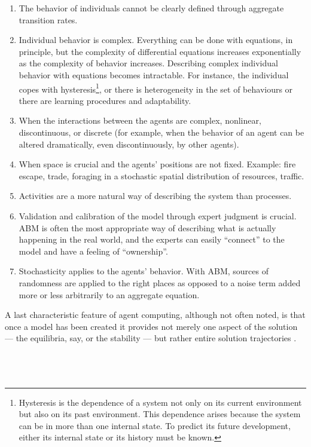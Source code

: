 \documentclass[11pt,oneside,a4paper,openright]{report}
\begin{document}
\begin{enumerate}[i-] 
\item The behavior of individuals cannot be clearly defined through aggregate transition rates.
\item Individual behavior is complex. Everything can be done with equations, in principle, but the complexity of differential equations increases exponentially as the complexity of behavior increases. Describing complex individual behavior with equations becomes intractable. For instance, the individual copes with hysteresis\footnote{Hysteresis is the dependence of a system not only on its current environment but also on its past environment. This dependence arises because the system can be in more than one internal state. To predict its future development, either its internal state or its history must be known\cite[p.571–597]{hysteresisDef}.}, or there is heterogeneity in the set of behaviours or there are learning procedures and adaptability.
\item When the interactions between the agents are complex, nonlinear, discontinuous, or discrete (for example, when the behavior of an agent can be altered dramatically, even discontinuously, by other agents).
\item When space is crucial and the agents' positions are not fixed. Example: fire escape, trade, foraging in a stochastic spatial distribution of resources, traffic.
\item Activities are a more natural way of describing the system than processes.
\item Validation and calibration of the model through expert judgment is crucial. ABM is often the most appropriate way of describing what is actually happening in the real world, and the experts can easily “connect” to the model and have a feeling of “ownership”. 
\item Stochasticity applies to the agents' behavior. With ABM, sources of randomness are applied to the right places as opposed to a noise term added more or less arbitrarily to an aggregate equation. 
\end{enumerate}

A last characteristic feature of agent computing, although not often noted, is that once a model has been created it provides not merely one aspect of the solution — the equilibria, say, or the stability — but rather entire solution trajectories \cite{Axtell2000}.\\
\\
\\
\\
\end{document}
